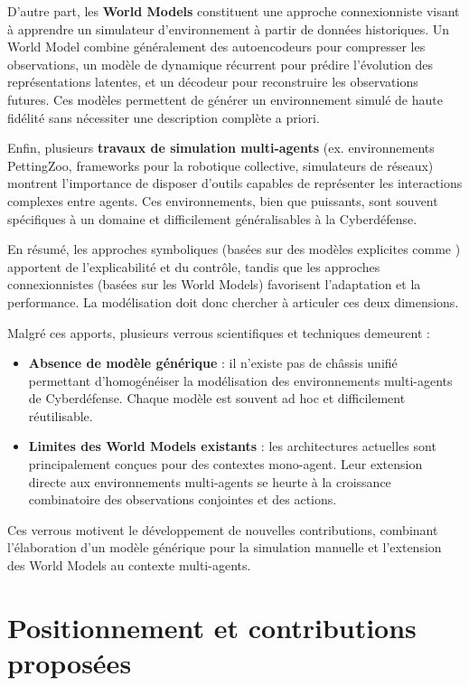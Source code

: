 D'autre part, les \textbf{World Models} constituent une approche connexionniste visant à apprendre un simulateur d'environnement à partir de données historiques.
Un World Model combine généralement des autoencodeurs pour compresser les observations, un modèle de dynamique récurrent pour prédire l'évolution des représentations latentes, et un décodeur pour reconstruire les observations futures.
Ces modèles permettent de générer un environnement simulé de haute fidélité sans nécessiter une description complète a priori.

Enfin, plusieurs \textbf{travaux de simulation multi-agents} (ex. environnements PettingZoo, frameworks pour la robotique collective, simulateurs de réseaux) montrent l'importance de disposer d'outils capables de représenter les interactions complexes entre agents.
Ces environnements, bien que puissants, sont souvent spécifiques à un domaine et difficilement généralisables à la Cyberdéfense.

En résumé, les approches symboliques (basées sur des modèles explicites comme ) apportent de l'explicabilité et du contrôle, tandis que les approches connexionnistes (basées sur les World Models) favorisent l'adaptation et la performance.
La modélisation doit donc chercher à articuler ces deux dimensions.

Malgré ces apports, plusieurs verrous scientifiques et techniques demeurent :
\begin{itemize}
  \item \textbf{Absence de modèle générique} : il n'existe pas de châssis unifié permettant d'homogénéiser la modélisation des environnements multi-agents de Cyberdéfense. Chaque modèle est souvent ad hoc et difficilement réutilisable.
  \item \textbf{Limites des World Models existants} : les architectures actuelles sont principalement conçues pour des contextes mono-agent. Leur extension directe aux environnements multi-agents se heurte à la croissance combinatoire des observations conjointes et des actions.
\end{itemize}

Ces verrous motivent le développement de nouvelles contributions, combinant l'élaboration d'un modèle générique pour la simulation manuelle et l'extension des World Models au contexte multi-agents.

\section{Positionnement et contributions proposées}

